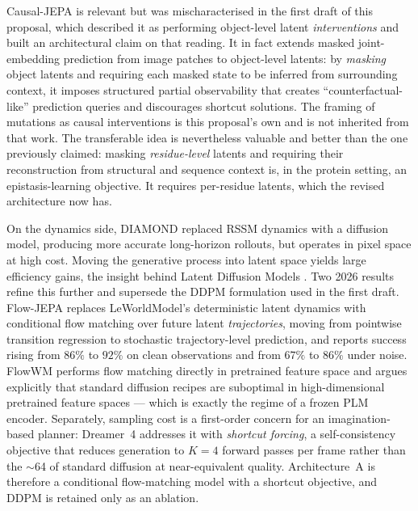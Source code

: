 \documentclass[12pt, a4paper]{article}
\begin{document}
Causal-JEPA \citep{nam2026cjepa} is relevant but was mischaracterised in the first draft of this proposal, which described it as performing object-level latent \textit{interventions} and built an architectural claim on that reading. It in fact extends masked joint-embedding prediction from image patches to object-level latents: by \textit{masking} object latents and requiring each masked state to be inferred from surrounding context, it imposes structured partial observability that creates ``counterfactual-like'' prediction queries and discourages shortcut solutions. The framing of mutations as causal interventions is this proposal's own and is not inherited from that work. The transferable idea is nevertheless valuable and better than the one previously claimed: masking \textit{residue-level} latents and requiring their reconstruction from structural and sequence context is, in the protein setting, an epistasis-learning objective. It requires per-residue latents, which the revised architecture now has.

On the dynamics side, DIAMOND \citep{alonso2024diamond} replaced RSSM dynamics with a diffusion model, producing more accurate long-horizon rollouts, but operates in pixel space at high cost. Moving the generative process into latent space yields large efficiency gains, the insight behind Latent Diffusion Models \citep{rombach2022ldm}. Two 2026 results refine this further and supersede the DDPM formulation used in the first draft. Flow-JEPA \citep{huo2026flowjepa} replaces LeWorldModel's deterministic latent dynamics with conditional flow matching \citep{lipman2023flowmatching} over future latent \textit{trajectories}, moving from pointwise transition regression to stochastic trajectory-level prediction, and reports success rising from $86\%$ to $92\%$ on clean observations and from $67\%$ to $86\%$ under noise. FlowWM \citep{porcher2026flowwm} performs flow matching directly in pretrained feature space and argues explicitly that standard diffusion recipes are suboptimal in high-dimensional pretrained feature spaces --- which is exactly the regime of a frozen PLM encoder. Separately, sampling cost is a first-order concern for an imagination-based planner: Dreamer~4 \citep{hafner2025dreamer4} addresses it with \textit{shortcut forcing}, a self-consistency objective that reduces generation to $K = 4$ forward passes per frame rather than the $\sim$64 of standard diffusion at near-equivalent quality. Architecture~A is therefore a conditional flow-matching model with a shortcut objective, and DDPM is retained only as an ablation.
\end{document}
